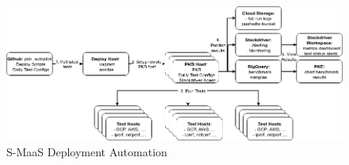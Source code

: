 


\begin{figure}[ht]
\centering
\includegraphics[width=.95\textwidth]{resource/img/ch_benchmarking/autopilot_arch.png}
\caption{S-MaaS Deployment Automation}
\label{fig:smaas:autopilot_arch}
\end{figure} 



